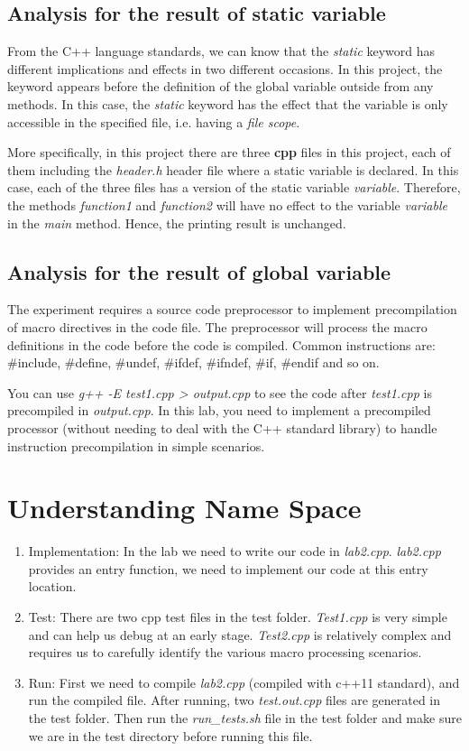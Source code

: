\documentclass[a4paper]{report}
\begin{document}
\subsection{Analysis for the result of static variable}
From the C++ language standards, we can know that the \emph{static} keyword has different implications and effects in two different occasions. In this project, the keyword appears before the definition of the global variable outside from any methods. In this case, the \emph{static} keyword has the effect that the variable is only accessible in the specified file, i.e. having a \emph{file scope}.
\par
More specifically, in this project there are three \textbf{cpp} files in this project, each of them including the \emph{header.h} header file where a static variable is declared. In this case, each of the three files has a version of the static variable \emph{variable}. Therefore, the methods \emph{function1} and \emph{function2} will have no effect to the variable \emph{variable} in the \emph{main} method. Hence, the printing result is unchanged.
\subsection{Analysis for the result of global variable}






The experiment requires a source code preprocessor to implement precompilation of macro directives in the code file. The preprocessor will process the macro definitions in the code before the code is compiled. Common instructions are: \#include, \#define, \#undef, \#ifdef, \#ifndef, \#if, \#endif and so on.
\par
You can use \emph{g++ -E test1.cpp > output.cpp} to see the code after \emph{test1.cpp} is precompiled in \emph{output.cpp}. In this lab, you need to implement a precompiled processor (without needing to deal with the C++ standard library) to handle instruction precompilation in simple scenarios.
\section{Understanding Name Space}
\begin{enumerate}
\item
Implementation: In the lab we need to write our code in \emph{lab2.cpp}. \emph{lab2.cpp} provides an entry function, we need to implement our code at this entry location.
\item
Test: There are two cpp test files in the test folder. \emph{Test1.cpp} is very simple and can help us debug at an early stage. \emph{Test2.cpp} is relatively complex and requires us to carefully identify the various macro processing scenarios.
\item
Run: First we need to compile \emph{lab2.cpp} (compiled with c++11 standard), and run the compiled file. After running, two \emph{test.out.cpp} files are generated in the test folder. Then run the \emph{run\_tests.sh} file in the test folder and make sure we are in the test directory before running this file.
\end{enumerate}
\end{document}
